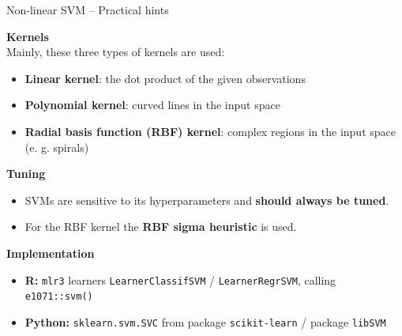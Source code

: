 \documentclass[11pt,compress,t,notes=noshow, xcolor=table]{beamer}
\newcommand{\highlight}[1]{\textcolor{highlightcol}{\textbf{#1}}}
\let\code=\texttt
\begin{document}
\begin{frame}{Non-linear SVM -- Practical hints}

\footnotesize

  \highlight{Kernels} \\
  \smallskip
 Mainly, these three types of kernels are used: 
 \begin{itemize}
 
 \item \textbf{Linear kernel}: the dot product of the given observations
 
 \item \textbf{Polynomial kernel}: curved lines in the input space
 
 \item \textbf{Radial basis function (RBF) kernel}: complex regions in the input space (e. g. spirals)
 
 \end{itemize}
 
 

\medskip

 \highlight{Tuning} \\
 \begin{itemize}
    \item SVMs are sensitive to its hyperparameters and \textbf{should always be tuned}. 
    \item For the RBF kernel the \textbf{RBF sigma heuristic} is used. 
  \end{itemize}
  

  \medskip

   \highlight{Implementation} 
  \begin{itemize}
    \item \textbf{R:} \code{mlr3} learners \code{LearnerClassifSVM} / 
    \code{LearnerRegrSVM}, calling \code{e1071::svm()}
    \item \textbf{Python:} \code{sklearn.svm.SVC} from package \code{scikit-learn} / package \code{libSVM}
  \end{itemize}

\end{frame}


\end{document}
